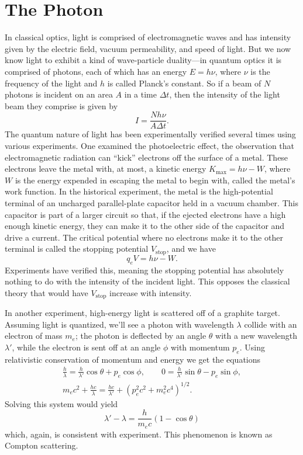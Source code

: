 \documentclass[../p051main.tex]{subfiles}
\begin{document}
\section{The Photon}
In classical optics, light is comprised of electromagnetic waves and has intensity given by the electric field, vacuum permeability, and speed of light.
But we now know light to exhibit a kind of wave-particle duality---in quantum optics it is comprised of photons, each of which has an energy $E = h\nu$, where $\nu$ is the frequency of the light and $h$ is called Planck's constant.
So if a beam of $N$ photons is incident on an area $A$ in a time $\Delta t$, then the intensity of the light beam they comprise is given by
\[ I = \frac{N h\nu}{A\Delta t}. \]
The quantum nature of light has been experimentally verified several times using various experiments.
One examined the photoelectric effect, the observation that electromagnetic radiation can ``kick'' electrons off the surface of a metal.
These electrons leave the metal with, at most, a kinetic energy $K_\textrm{max} = h\nu - W$, where $W$ is the energy expended in escaping the metal to begin with, called the metal's work function.
In the historical experiment, the metal is the high-potential terminal of an uncharged parallel-plate capacitor held in a vacuum chamber.
This capacitor is part of a larger circuit so that, if the ejected electrons have a high enough kinetic energy, they can make it to the other side of the capacitor and drive a current.
The critical potential where no electrons make it to the other terminal is called the stopping potential $V_\textrm{stop}$, and we have
\[ q_e V = h\nu - W. \]
Experiments have verified this, meaning the stopping potential has absolutely nothing to do with the intensity of the incident light.
This opposes the classical theory that would have $V_\textrm{stop}$ increase with intensity.

In another experiment, high-energy light is scattered off of a graphite target.
Assuming light is quantized, we'll see a photon with wavelength $\lambda$ collide with an electron of mass $m_e$; the photon is deflected by an angle $\theta$ with a new wavelength $\lambda'$, while the electron is sent off at an angle $\phi$ with momentum $p_e$.
Using relativistic conservation of momentum and energy we get the equations
\begin{gather*}
    \frac{h}{\lambda} = \frac{h}{\lambda'} \cos \theta + p_e \cos \phi, \qquad 0 = \frac{h}{\lambda'} \sin \theta - p_e \sin \phi, \\
    m_e c^2 + \frac{hc}{\lambda} = \frac{hc}{\lambda'} + \left( p_e^2 c^2 + m_e^2c^4 \right)^{1/2}.
\end{gather*}
Solving this system would yield
\[ \lambda' - \lambda = \frac{h}{m_e c} (1 - \cos \theta) \]
which, again, is consistent with experiment.
This phenomenon is known as Compton scattering.
\vspace{1pt}
\end{document}
